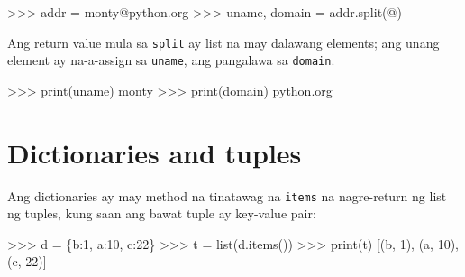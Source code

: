 \documentclass[10pt,]{book}
\newenvironment{Shaded}{}{}
\newcommand{\BuiltInTok}[1]{\textcolor[rgb]{0.00,0.50,0.00}{#1}}
\newcommand{\DecValTok}[1]{\textcolor[rgb]{0.25,0.63,0.44}{#1}}
\newcommand{\NormalTok}[1]{#1}
\newcommand{\OperatorTok}[1]{\textcolor[rgb]{0.40,0.40,0.40}{#1}}
\newcommand{\StringTok}[1]{\textcolor[rgb]{0.25,0.44,0.63}{#1}}
\begin{document}
  

\begin{Shaded}
\begin{Highlighting}[]
\OperatorTok{\textgreater{}\textgreater{}\textgreater{}}\NormalTok{ addr }\OperatorTok{=} \StringTok{\textquotesingle{}monty@python.org\textquotesingle{}}
\OperatorTok{\textgreater{}\textgreater{}\textgreater{}}\NormalTok{ uname, domain }\OperatorTok{=}\NormalTok{ addr.split(}\StringTok{\textquotesingle{}@\textquotesingle{}}\NormalTok{)}
\end{Highlighting}
\end{Shaded}

Ang return value mula sa \texttt{split} ay list na may dalawang
elements; ang unang element ay na-a-assign sa \texttt{uname}, ang
pangalawa sa \texttt{domain}.

\begin{Shaded}
\begin{Highlighting}[]
\OperatorTok{\textgreater{}\textgreater{}\textgreater{}} \BuiltInTok{print}\NormalTok{(uname)}
\NormalTok{monty}
\OperatorTok{\textgreater{}\textgreater{}\textgreater{}} \BuiltInTok{print}\NormalTok{(domain)}
\NormalTok{python.org}
\end{Highlighting}
\end{Shaded}

\section{Dictionaries and tuples}\label{dictionaries-and-tuples}

  

Ang dictionaries ay may method na tinatawag na \texttt{items} na
nagre-return ng list ng tuples, kung saan ang bawat tuple ay key-value
pair:

\begin{Shaded}
\begin{Highlighting}[]
\OperatorTok{\textgreater{}\textgreater{}\textgreater{}}\NormalTok{ d }\OperatorTok{=}\NormalTok{ \{}\StringTok{\textquotesingle{}b\textquotesingle{}}\NormalTok{:}\DecValTok{1}\NormalTok{, }\StringTok{\textquotesingle{}a\textquotesingle{}}\NormalTok{:}\DecValTok{10}\NormalTok{, }\StringTok{\textquotesingle{}c\textquotesingle{}}\NormalTok{:}\DecValTok{22}\NormalTok{\}}
\OperatorTok{\textgreater{}\textgreater{}\textgreater{}}\NormalTok{ t }\OperatorTok{=} \BuiltInTok{list}\NormalTok{(d.items())}
\OperatorTok{\textgreater{}\textgreater{}\textgreater{}} \BuiltInTok{print}\NormalTok{(t)}
\NormalTok{[(}\StringTok{\textquotesingle{}b\textquotesingle{}}\NormalTok{, }\DecValTok{1}\NormalTok{), (}\StringTok{\textquotesingle{}a\textquotesingle{}}\NormalTok{, }\DecValTok{10}\NormalTok{), (}\StringTok{\textquotesingle{}c\textquotesingle{}}\NormalTok{, }\DecValTok{22}\NormalTok{)]}
\end{Highlighting}
\end{Shaded}
\end{document}
